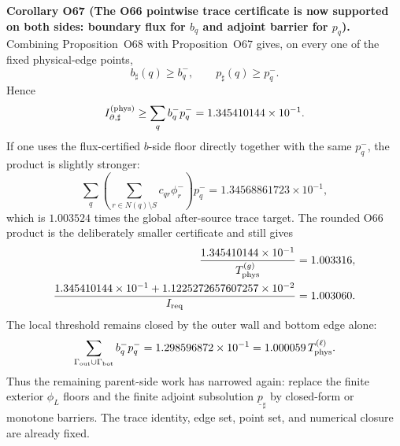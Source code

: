 \documentclass[aps,prd,onecolumn,notitlepage,nofootinbib,superscriptaddress,11pt,floatfix]{revtex4-2}
\begin{document}
\medskip\noindent\textbf{Corollary O67 (The O66 pointwise trace certificate is now supported on both sides: boundary flux for \(b_q\) and adjoint barrier for \(p_q\)).}
Combining Proposition~O68 with Proposition~O67 gives, on every one of the fixed physical-edge points,
\[
b_\sharp(q)\ge b_q^-,
\qquad
p_\sharp(q)\ge p_q^-.
\]
Hence
\[
I_{\partial,\sharp}^{(\rm phys)}
\ge
\sum_q b_q^-p_q^-
=1.345410144\times10^{-1}.
\]
If one uses the flux-certified \(b\)-side floor directly together with the same \(p_q^-\), the product is slightly stronger:
\[
\sum_q
\left(
\sum_{r\in N(q)\setminus S}c_{qr}\phi_r^-
\right)p_q^-
=1.34568861723\times10^{-1},
\]
which is \(1.003524\) times the global after-source trace target.  The rounded O66 product is the deliberately smaller certificate and still gives
\[
\begin{aligned}
\frac{1.345410144\times10^{-1}}{T_{\rm phys}^{(g)}}&=1.003316,\\
\frac{1.345410144\times10^{-1}+1.1225272657607257\times10^{-2}}
{I_{\rm req}}
&=1.003060.
\end{aligned}
\]
The local threshold remains closed by the outer wall and bottom edge alone:
\[
\sum_{\Gamma_{\rm out}\cup\Gamma_{\rm bot}}b_q^-p_q^-
=1.298596872\times10^{-1}
=1.000059\,T_{\rm phys}^{(\ell)}.
\]
Thus the remaining parent-side work has narrowed again: replace the finite exterior \(\phi_L\) floors and the finite adjoint subsolution \(\underline p_\sharp\) by closed-form or monotone barriers.  The trace identity, edge set, point set, and numerical closure are already fixed.
\end{document}
